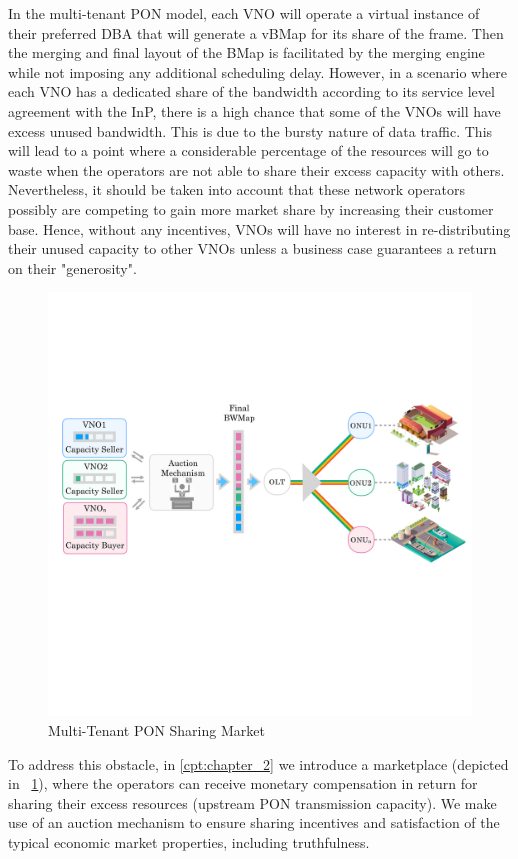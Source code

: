In the multi-tenant \ac{PON} model, each \ac{VNO} will operate a virtual instance of their preferred \ac{DBA} that will generate a \ac{vBMap} for its share of the frame. Then the merging and final layout of the \ac{BMap} is facilitated by the merging engine while not imposing any additional scheduling delay. However, in a scenario where each \ac{VNO} has a dedicated share of the bandwidth according to its service level agreement with the \ac{InP}, there is a high chance that some of the \acp{VNO} will have excess unused bandwidth. This is due to the bursty nature of data traffic. This will lead to a point where a considerable percentage of the resources will go to waste when the operators are not able to share their excess capacity with others. 
Nevertheless, it should be taken into account that these network operators possibly are competing to gain more market share by increasing their customer base. Hence, without any incentives, \acp{VNO} will have no interest in re-distributing their unused capacity to other \acp{VNO} unless a business case guarantees a return on their "generosity". 
\begin{figure}
\centering
\includegraphics[width=\linewidth]{Figures/pon_new.pdf}
\caption{Multi-Tenant PON Sharing Market}
\label{market-fig}
\end{figure}
To address this obstacle, in \autoref{cpt:chapter_2} we introduce a marketplace (depicted in \figureautorefname~\ref{market-fig}), where the operators can receive monetary compensation in return for sharing their excess resources (upstream PON transmission capacity). We make use of an auction mechanism to ensure sharing incentives and satisfaction of the typical economic market properties, including truthfulness.
